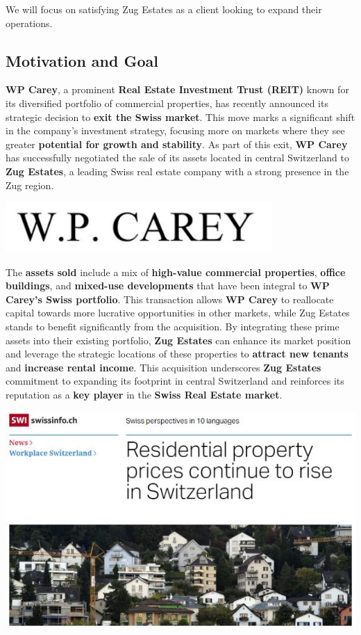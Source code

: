 \documentclass[
]{article}
\begin{document}
We will focus on satisfying Zug Estates as a client looking to expand
their operations.

\subsection{Motivation and Goal}\label{motivation-and-goal}

\textbf{WP Carey}, a prominent \textbf{Real Estate Investment Trust
(REIT)} known for its diversified portfolio of commercial properties,
has recently announced its strategic decision to \textbf{exit the Swiss
market}. This move marks a significant shift in the company's investment
strategy, focusing more on markets where they see greater
\textbf{potential for growth and stability}. As part of this exit,
\textbf{WP Carey} has successfully negotiated the sale of its assets
located in central Switzerland to \textbf{Zug Estates}, a leading Swiss
real estate company with a strong presence in the Zug region.

\includegraphics[width=4in,height=\textheight]{images/wp carey.JPG}

The \textbf{assets sold} include a mix of \textbf{high-value commercial
properties}, \textbf{office buildings}, and \textbf{mixed-use
developments} that have been integral to \textbf{WP Carey's Swiss
portfolio}. This transaction allows \textbf{WP Carey} to reallocate
capital towards more lucrative opportunities in other markets, while Zug
Estates stands to benefit significantly from the acquisition. By
integrating these prime assets into their existing portfolio,
\textbf{Zug Estates} can enhance its market position and leverage the
strategic locations of these properties to \textbf{attract new tenants}
and \textbf{increase rental income}. This acquisition underscores
\textbf{Zug Estates} commitment to expanding its footprint in central
Switzerland and reinforces its reputation as a \textbf{key player} in
the \textbf{Swiss Real Estate market}.

\includegraphics[width=10in,height=\textheight]{images/swissinfo.JPG}
\end{document}
